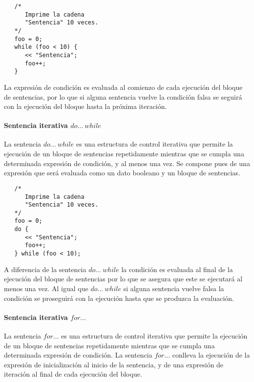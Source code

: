 \begin{lstlisting}
   /*
      Imprime la cadena 
      "Sentencia" 10 veces.
   */
   foo = 0;
   while (foo < 10) {
      << "Sentencia"; 
      foo++;
   }
\end{lstlisting}

La expresión de condición es evaluada al comienzo de cada ejecución del bloque de sentencias, por lo que si alguna sentencia vuelve 
la condición falsa se seguirá con la ejecución del bloque hasta la próxima iteración.

\paragraph{Sentencia iterativa $do...\ while$} \label{sec:stmt_dowhile}

La sentencia $do...\ while$ es una estructura de control iterativa que permite la ejecución de un bloque de 
sentencias repetidamente mientras que se cumpla una determinada expresión de condición, y al menos una vez. Se compone pues de una expresión que será evaluada como 
un dato booleano y un bloque de sentencias. \\


\begin{lstlisting}
   /*
      Imprime la cadena 
      "Sentencia" 10 veces.
   */
   foo = 0;
   do {
      << "Sentencia"; 
      foo++;
   } while (foo < 10);
\end{lstlisting}

A diferencia de la sentencia $do...\ while$ la condición es evaluada al final de la ejecución del bloque de sentencias por lo que se asegura que este
se ejecutará al menos una vez. Al igual que $do...\ while$ si alguna sentencia vuelve falsa la condición se proseguirá con la ejecución hasta que se 
produzca la evaluación.

\paragraph{Sentencia iterativa $for...$} \label{sec:stmt_for}

La sentencia $for...$ es una estructura de control iterativa que permite la ejecución de un bloque de 
sentencias repetidamente mientras que se cumpla una determinada expresión de condición. La sentencia $for...$ conlleva
la ejecución de la expresión de inicialización al inicio de la sentencia, y de una expresión de iteración al final de cada ejecución del
bloque. \\

